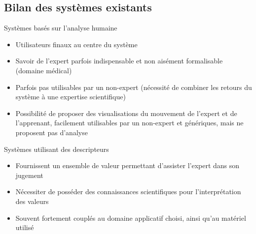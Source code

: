\documentclass[svgnames]{beamer}
\begin{document}
	\subsection{Bilan des systèmes existants}
	\begin{frame}{\subsecname}
		\begin{block}{Systèmes basés sur l'analyse humaine}
			\begin{itemize}[label=$\bullet$]
				\item Utilisateurs finaux au centre du système
				\item Savoir de l'expert parfois indispensable et non aisément formalisable (domaine médical)
				\item Parfois pas utilisables par un non-expert (nécessité de combiner les retours du système à une expertise scientifique)
				\item Possibilité de proposer des visualisations du mouvement de l'expert et de l'apprenant, facilement utilisables par un non-expert et génériques, mais ne proposent pas d'analyse
			\end{itemize}
		\end{block}
		
		\begin{block}{Systèmes utilisant des descripteurs}
			\begin{itemize}[label=$\bullet$]
				\item Fournissent un ensemble de valeur permettant d'assister l'expert dans son jugement
				\item Nécessiter de posséder des connaissances scientifiques pour l'interprétation des valeurs
				\item Souvent fortement couplés au domaine applicatif choisi, ainsi qu'au matériel utilisé
			\end{itemize}
		\end{block}
	\end{frame}
	
\end{document}
